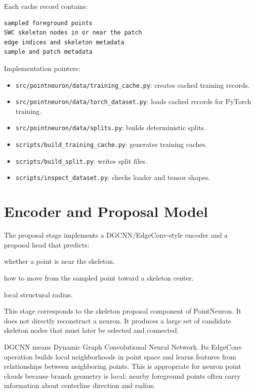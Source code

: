 \documentclass[11pt]{article}
\begin{document}
Each cache record contains:

\begin{lstlisting}
sampled foreground points
SWC skeleton nodes in or near the patch
edge indices and skeleton metadata
sample and patch metadata
\end{lstlisting}

Implementation pointers:

\begin{itemize}
  \item \texttt{src/pointneuron/data/training\_cache.py}: creates cached
  training records.
  \item \texttt{src/pointneuron/data/torch\_dataset.py}: loads cached records
  for PyTorch training.
  \item \texttt{src/pointneuron/data/splits.py}: builds deterministic splits.
  \item \texttt{scripts/build\_training\_cache.py}: generates training caches.
  \item \texttt{scripts/build\_split.py}: writes split files.
  \item \texttt{scripts/inspect\_dataset.py}: checks loader and tensor shapes.
\end{itemize}

\section{Encoder and Proposal Model}

The proposal stage implements a DGCNN/EdgeConv-style encoder and a proposal head
that predicts:

\begin{description}[leftmargin=3cm]
  \item[Objectness] whether a point is near the skeleton.
  \item[Center offset] how to move from the sampled point toward a skeleton
  center.
  \item[Radius] local structural radius.
\end{description}

This stage corresponds to the skeleton proposal component of PointNeuron. It
does not directly reconstruct a neuron. It produces a large set of candidate
skeleton nodes that must later be selected and connected.

DGCNN means Dynamic Graph Convolutional Neural Network. Its EdgeConv operation
builds local neighborhoods in point space and learns features from relationships
between neighboring points. This is appropriate for neuron point clouds because
branch geometry is local: nearby foreground points often carry information about
centerline direction and radius.
\end{document}
